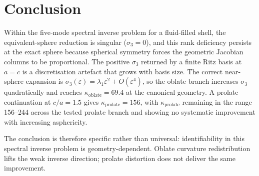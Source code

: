 \section{Conclusion}

Within the five-mode spectral inverse problem for a fluid-filled shell, the
equivalent-sphere reduction is singular ($\sigma_3=0$), and this rank deficiency
persists at the exact sphere because spherical symmetry forces the geometric
Jacobian columns to be proportional.  The positive $\sigma_3$ returned by a
finite Ritz basis at $a=c$ is a discretisation artefact that grows with basis
size.  The correct near-sphere expansion is
$\sigma_3(\varepsilon)=\lambda_1\varepsilon^2+O(\varepsilon^4)$, so the oblate
branch increases $\sigma_3$ quadratically and reaches
$\kappa_\mathrm{oblate}=\num{69.4}$ at the canonical geometry.  A prolate
continuation at $c/a=\num{1.5}$ gives $\kappa_\mathrm{prolate}=156$, with
$\kappa_\mathrm{prolate}$ remaining in the range 156--244 across the tested
prolate branch and showing no systematic improvement with increasing
asphericity.

The conclusion is therefore specific rather than universal: identifiability in
this spectral inverse problem is geometry-dependent.  Oblate curvature
redistribution lifts the weak inverse direction; prolate distortion does not
deliver the same improvement.
